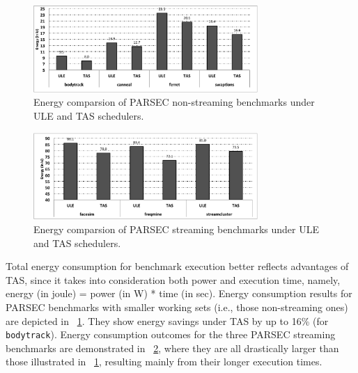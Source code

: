 \documentclass[times, 10pt,twocolumn]{IEEEtran}
\begin{document}
\begin{figure}[!tbp]
  \centering
  \includegraphics[width=1.0\linewidth,height=1.3in]{parsecedp1.pdf}
  \caption{Energy comparsion of PARSEC non-streaming benchmarks under ULE and TAS
    schedulers.}
  \label{fig:pedpsmall}
\end{figure}
\begin{figure}[!tp]
  \centering
  \includegraphics[width=1.0\linewidth,height=1.3in]{parsecedp2.pdf}
  \caption{Energy comparsion of PARSEC streaming benchmarks under ULE and TAS
    schedulers.}
  \label{fig:pedpstreaming}
\end{figure}
Total energy consumption for benchmark execution better reflects
advantages of TAS, since it takes into consideration both power and
execution time, namely, energy (in joule) = power (in W) * time (in
sec).  Energy consumption results for PARSEC benchmarks with smaller
working sets (i.e., those non-streaming ones) are depicted in
\figurename~\ref{fig:pedpsmall}.  They show energy savings under TAS by
up to 16\% (for \texttt{bodytrack}).  Energy consumption outcomes for
the three PARSEC streaming benchmarks are demonstrated in \figurename\ 
\ref{fig:pedpstreaming}, where they are all drastically larger than
those illustrated in \figurename\ \ref{fig:pedpsmall}, resulting mainly
from their longer execution times.
\end{document}

